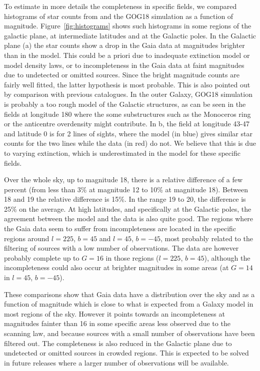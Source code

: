 To estimate in more details the completeness in specific fields, we compared histograms of star counts from {} and the GOG18 simulation as a function of magnitude. Figure~\ref{fig:histograms} shows such histograms in some regions of the galactic plane, at intermediate latitudes and at the Galactic poles.  
In the Galactic plane (a) the star counts show a drop in the Gaia data at magnitudes brighter than in the model. This could be a priori due to inadequate extinction model or model density laws, or to incompleteness in the Gaia data at faint magnitudes due to undetected or omitted sources. Since the bright magnitude counts are fairly well fitted, the latter hypothesis is most probable. This is also pointed out by comparison with previous catalogues. In the outer Galaxy, GOG18 simulation is probably a too rough model of the Galactic structures, as can be seen in the fields at longitude 180{\deg} 
where the some substructures such as the Monoceros ring or the anticentre overdensity might contribute.
In b, the field at longitude 43-47{\deg} and latitude 0{\deg} is for 2 lines of sights, where the model (in blue) gives similar star counts for the two lines while the data (in red) do not. We believe that this is due to varying extinction, which is underestimated in the model for these specific fields.

Over the whole sky, up to magnitude 18, there is a relative difference of a few percent (from less than 3\% at magnitude 12 to 10\% at magnitude 18). Between 18 and 19 the relative difference is 15\%. In the range 19 to 20, the difference is 25\% on the average. 
At high latitudes, and specifically at the Galactic poles, the agreement between the model and the data is also quite good. The regions where the Gaia data seem to suffer from incompleteness are located in the specific regions around $l=225${\deg}, $b=45${\deg} and $l=45${\deg}, $b=-45${\deg}, most probably related to the filtering of sources with a low number of observations. %
The data are however probably complete up to $G=16$ in those regions ($l=225${\deg}, $b=45${\deg}), although the incompleteness could also occur at brighter magnitudes in some areas (at $G=14$ in $l=45${\deg}, $b=-45${\deg}). 

These comparisons show that Gaia data have a distribution over the sky and as a function of magnitude which is close to what is expected from a Galaxy model in most regions of the sky. However it points towards an incompleteness at magnitudes fainter than 16 in some specific areas less observed due to the scanning law, and because sources with a small number of observations have been filtered out. The completeness is also reduced in the Galactic plane due to undetected or omitted sources in crowded regions. This is expected to be solved in future releases where a larger number of observations will be available.


